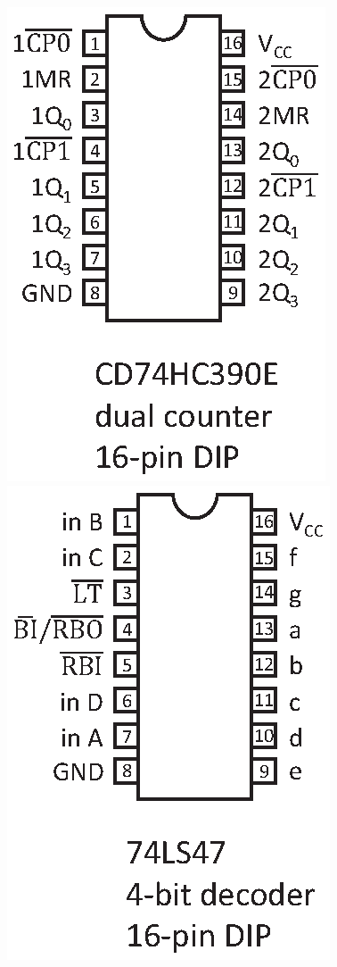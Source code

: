 \vspace{-0.15in}
\hspace{0.25in}
\includegraphics[scale=0.75]{appendices/pinouts/cd74hc390e.eps}
\hspace{-0.3in}
\includegraphics[scale=0.75]{appendices/pinouts/74LS47.eps}
